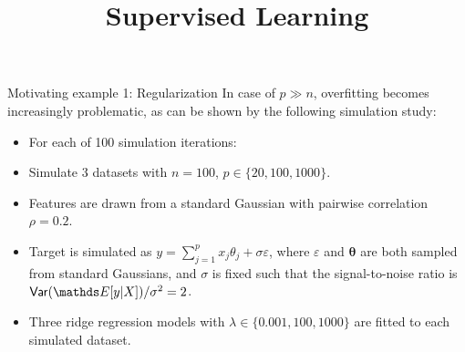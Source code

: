\documentclass[11pt,compress,t,notes=noshow, xcolor=table]{beamer}
\title{Supervised Learning}
\date{}
\begin{document}

  \begin{vbframe}{Motivating example 1: Regularization}
  In case of $p \gg n$,  overfitting becomes increasingly problematic, as can be shown by the following simulation study:
  
  \begin{itemize}
    \item For each of 100 simulation iterations:
    \item Simulate 3 datasets with $n=100$, $p \in \{ 20, 100, 1000 \}$.
    \item Features are drawn from a standard Gaussian with pairwise correlation $\rho=0.2$.
      \item Target is simulated as
    $ y = \sum_{j=1}^p x_j \theta_j + \sigma\varepsilon $, where $\varepsilon$ and $\bm{\theta}$ are both sampled from standard Gaussians, and $\sigma$ is fixed such that the signal-to-noise ratio is $\var (\E[y|X]) / \sigma^2 = 2$.
    \item Three ridge regression models with $\lambda \in \{ 0.001, 100, 1000 \}$ are fitted to each simulated dataset.
  \end{itemize}
  
  \framebreak
  

\end{vbframe}
\end{document}
